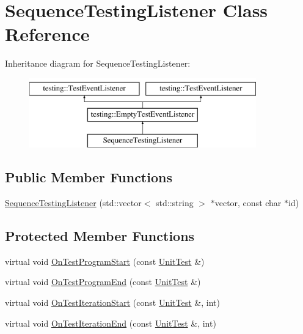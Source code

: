 \hypertarget{class_sequence_testing_listener}{\section{Sequence\-Testing\-Listener Class Reference}
\label{class_sequence_testing_listener}
}
Inheritance diagram for Sequence\-Testing\-Listener\-:\begin{figure}[H]
\begin{center}
\leavevmode
\includegraphics[height=3.000000cm]{class_sequence_testing_listener}
\end{center}
\end{figure}
\subsection*{Public Member Functions}
\begin{DoxyCompactItemize}
\item 
\hyperlink{class_sequence_testing_listener_ac0fcb350d20876f8273621ad4c79ba7a}{Sequence\-Testing\-Listener} (std\-::vector$<$ std\-::string $>$ $\ast$vector, const char $\ast$id)
\end{DoxyCompactItemize}
\subsection*{Protected Member Functions}
\begin{DoxyCompactItemize}
\item 
virtual void \hyperlink{class_sequence_testing_listener_a25b96acdbaa6f582e583e6b56bd39b42}{On\-Test\-Program\-Start} (const \hyperlink{classtesting_1_1_unit_test}{Unit\-Test} \&)
\item 
virtual void \hyperlink{class_sequence_testing_listener_aacac5e15bac089460841ff63a5c31f57}{On\-Test\-Program\-End} (const \hyperlink{classtesting_1_1_unit_test}{Unit\-Test} \&)
\item 
virtual void \hyperlink{class_sequence_testing_listener_a345641262fa10cc4b251ac54116db74b}{On\-Test\-Iteration\-Start} (const \hyperlink{classtesting_1_1_unit_test}{Unit\-Test} \&, int)
\item 
virtual void \hyperlink{class_sequence_testing_listener_a783bc01e2a95f5bf73bbde4d96832e0f}{On\-Test\-Iteration\-End} (const \hyperlink{classtesting_1_1_unit_test}{Unit\-Test} \&, int)
\end{DoxyCompactItemize}


